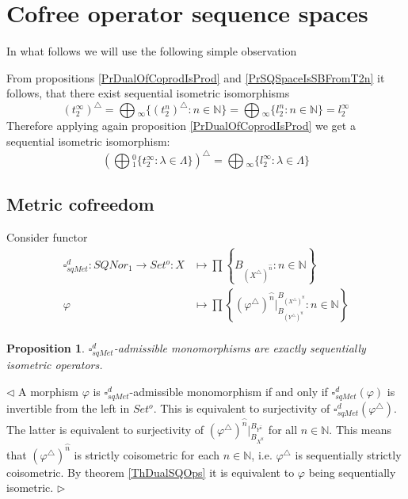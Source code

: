 \documentclass[12pt]{article}
\newtheorem{proposition}[theorem]{Proposition}
\newenvironment{proof}{\par $\triangleleft$}{$\triangleright$}
\begin{document}
\section{Cofree operator sequence spaces}

In what follows we will use the following simple observation 

From propositions \ref{PrDualOfCoprodIsProd} and \ref{PrSQSpaceIsSBFromT2n} it follows, that there exist sequential isometric isomorphisms
$$
(t_2^\infty)^\triangle
=\bigoplus{}_\infty\{(t_2^n)^\triangle:n\in\mathbb{N}\}
=\bigoplus{}_\infty\{l_2^n:n\in\mathbb{N}\}
=l_2^\infty
$$
Therefore applying again proposition \ref{PrDualOfCoprodIsProd} we get a sequential isometric isomorphism:
$$
\left(\bigoplus{}_1^0\{t_2^\infty:\lambda\in\Lambda\}\right)^\triangle
=\bigoplus{}_\infty\{l_2^\infty:\lambda\in\Lambda\}
$$
 
\subsection{Metric cofreedom}

Consider functor
$$
\begin{aligned}
\square_{sqMet}^d : SQNor_1 \to Set^o: X &\mapsto \prod \left\{B_{(X^\triangle )^{\wideparen{n}}}:n\in\mathbb{N}\right\}\\
\varphi&\mapsto\prod\left\{ (\varphi^\triangle )^{\wideparen{n}}|_{B_{(Y^\triangle )^{\wideparen{n}}}}^{B_{(X^\triangle )^{\wideparen{n}}}}:n\in\mathbb{N}\right\}\\
\end{aligned}
$$
\begin{proposition}\label{PrDecsMetrAdmMonoMorph}
$\square_{sqMet}^d$-admissible monomorphisms are exactly sequentially isometric operators.
\end{proposition}
\begin{proof}
A morphism $\varphi$ is $\square_{sqMet}^d$-admissible monomorphism if and only if $\square_{sqMet}^d(\varphi)$ is invertible from the left in $Set^o$. This is equivalent to surjectivity of 
$\square_{sqMet}^d(\varphi^\triangle)$. The latter is equivalent to surjectivity of $(\varphi^\triangle)^{\wideparen{n}}|_{B_{X^{\wideparen{n}}}}^{B_{Y^{\wideparen{n}}}}$ 
for all $n\in\mathbb{N}$. This means that $(\varphi^\triangle)^{\wideparen{n}}$ is strictly coisometric for each $n\in\mathbb{N}$, i.e. $\varphi^\triangle$ is sequentially strictly coisometric. By theorem 
\ref{ThDualSQOps} it is equivalent to $\varphi$ being sequentially isometric.
\end{proof}
\end{document}
